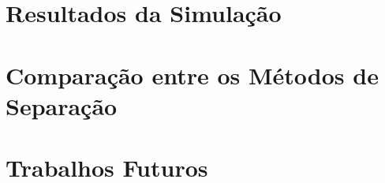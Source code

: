 \section{Resultados da Simulação}
\section{Comparação entre os Métodos de Separação}
\section{Trabalhos Futuros}